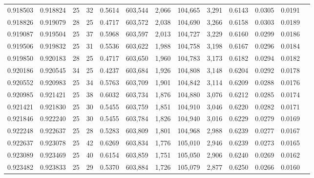 \begin{tabular}{rrrrrrrrrrrrr}
0.918503 & 0.918824 &    25 &  32 &                                     0.5614 & 603,544 &   2,066 & 104,665 &   3,291 & 0.6143 & 0.0305 & 0.0191 \\
0.918826 & 0.919079 &    28 &  25 &                                     0.4717 & 603,572 &   2,038 & 104,690 &   3,266 & 0.6158 & 0.0303 & 0.0189 \\
0.919087 & 0.919504 &    25 &  37 &                                     0.5968 & 603,597 &   2,013 & 104,727 &   3,229 & 0.6160 & 0.0299 & 0.0186 \\
0.919506 & 0.919832 &    25 &  31 &                                     0.5536 & 603,622 &   1,988 & 104,758 &   3,198 & 0.6167 & 0.0296 & 0.0184 \\
0.919850 & 0.920183 &    28 &  25 &                                     0.4717 & 603,650 &   1,960 & 104,783 &   3,173 & 0.6182 & 0.0294 & 0.0182 \\
0.920186 & 0.920545 &    34 &  25 &                                     0.4237 & 603,684 &   1,926 & 104,808 &   3,148 & 0.6204 & 0.0292 & 0.0178 \\
0.920552 & 0.920983 &    25 &  34 &                                     0.5763 & 603,709 &   1,901 & 104,842 &   3,114 & 0.6209 & 0.0288 & 0.0176 \\
0.920985 & 0.921421 &    25 &  38 &                                     0.6032 & 603,734 &   1,876 & 104,880 &   3,076 & 0.6212 & 0.0285 & 0.0174 \\
0.921421 & 0.921830 &    25 &  30 &                                     0.5455 & 603,759 &   1,851 & 104,910 &   3,046 & 0.6220 & 0.0282 & 0.0171 \\
0.921846 & 0.922240 &    25 &  30 &                                     0.5455 & 603,784 &   1,826 & 104,940 &   3,016 & 0.6229 & 0.0279 & 0.0169 \\
0.922248 & 0.922637 &    25 &  28 &                                     0.5283 & 603,809 &   1,801 & 104,968 &   2,988 & 0.6239 & 0.0277 & 0.0167 \\
0.922637 & 0.923078 &    25 &  42 &                                     0.6269 & 603,834 &   1,776 & 105,010 &   2,946 & 0.6239 & 0.0273 & 0.0165 \\
0.923089 & 0.923469 &    25 &  40 &                                     0.6154 & 603,859 &   1,751 & 105,050 &   2,906 & 0.6240 & 0.0269 & 0.0162 \\
0.923482 & 0.923833 &    25 &  29 &                                     0.5370 & 603,884 &   1,726 & 105,079 &   2,877 & 0.6250 & 0.0266 & 0.0160 \\

\end{tabular}
